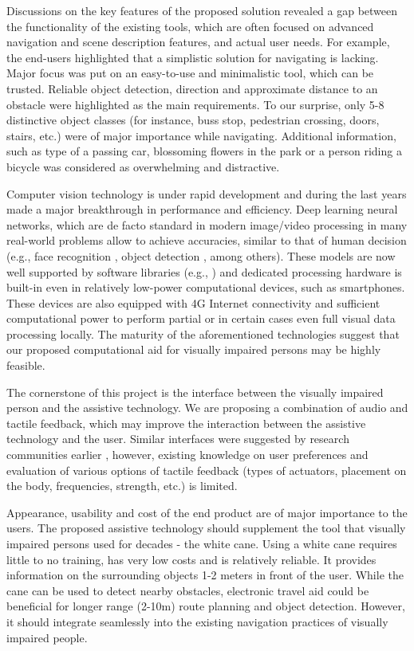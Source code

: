 \documentclass[10pt,conference,compsocconf]{IEEEtran}
\begin{document}
Discussions on the key features of the proposed solution revealed a gap between the functionality of the existing tools, which are often focused on advanced navigation and scene description features, and actual user needs. For example, the end-users highlighted that a simplistic solution for navigating is lacking. Major focus was put on an easy-to-use and minimalistic tool, which can be trusted. Reliable object detection, direction and approximate distance to an obstacle were highlighted as the main requirements. To our surprise, only 5-8 distinctive object classes (for instance, buss stop, pedestrian crossing, doors, stairs, etc.) were of major importance while navigating. Additional information, such as type of a passing car, blossoming flowers in the park or a person riding a bicycle was considered as overwhelming and distractive. 

Computer vision technology is under rapid development and during the last years made a major breakthrough in performance and efficiency. Deep learning neural networks, which are de facto standard in modern image/video processing in many real-world problems allow to achieve accuracies, similar to that of human decision (e.g., face recognition \cite{Amos}, object detection \cite{Ren}, among others). These models are now well supported by software libraries (e.g., \cite{Tensorflow}) and dedicated processing hardware is built-in even in relatively low-power computational devices, such as smartphones. These devices are also equipped with 4G Internet connectivity and sufficient computational power to perform partial or in certain cases even full visual data processing locally. The maturity of the aforementioned technologies suggest that our proposed computational aid for visually impaired persons may be highly feasible. 


The cornerstone of this project is the interface between the visually impaired person and the assistive technology. We are proposing a combination of audio and tactile feedback, which may improve the interaction between the assistive technology and the user. Similar interfaces were suggested by research communities earlier \cite{Poggi}\cite{Zientara}, however, existing knowledge on user preferences and evaluation of various options of tactile feedback (types of actuators, placement on the body, frequencies, strength, etc.) is limited. 

Appearance, usability and cost of the end product are of major importance to the users. The proposed assistive technology should supplement the tool that visually impaired persons used for decades - the white cane. Using a white cane requires little to no training, has very low costs and is relatively reliable. It provides information on the surrounding objects 1-2 meters in front of the user. While the cane can be used to detect nearby obstacles, electronic travel aid could be beneficial for longer range (2-10m) route planning and object detection. However, it should integrate seamlessly into the existing navigation practices of visually impaired people. 
\end{document}
